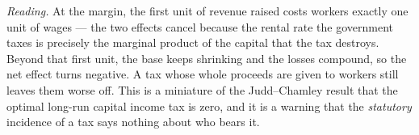 \documentclass[12pt, letterpaper]{article}
\begin{document}
\begin{tcolorbox}[evenbox,title={Problem 9.6 \quad Capital Income Taxes}]
\begin{enumerate}
\smallskip
\emph{Reading.} At the margin, the first unit of revenue raised costs workers exactly one unit
of wages --- the two effects cancel because the rental rate the government taxes is precisely
the marginal product of the capital that the tax destroys. Beyond that first unit, the base
keeps shrinking and the losses compound, so the net effect turns negative. A tax whose whole
proceeds are given to workers still leaves them worse off. This is a miniature of the
Judd--Chamley result that the optimal long-run capital income tax is zero, and it is a warning
that the \emph{statutory} incidence of a tax says nothing about who bears it.
\end{enumerate}
\end{tcolorbox}

\end{document}
